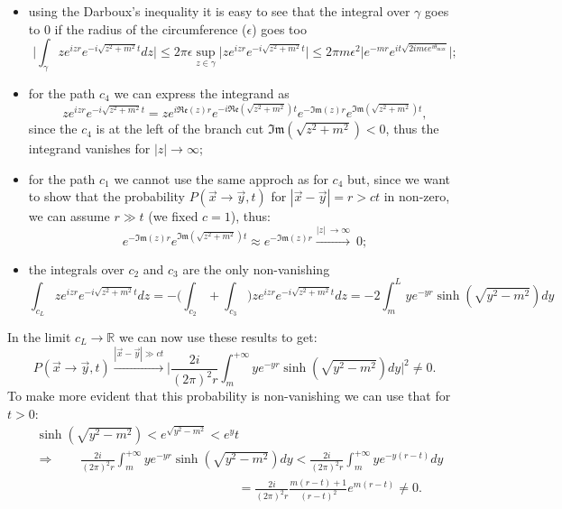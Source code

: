 \begin{itemize}
    \item using the Darboux's inequality it is easy to see that the integral over $\gamma$ goes to 0 if the radius of the circumference ($\epsilon$) goes too 
    \begin{equation*}
        \bigg|\int_{\gamma}ze^{izr}e^{-i\sqrt{z^2+m^2}t}dz\bigg|\leq2\pi \epsilon\sup_{z\in\gamma}\bigg|ze^{izr}e^{-i\sqrt{z^2+m^2}t}\bigg|\leq2\pi m \epsilon^2\bigg|e^{-mr}e^{it\sqrt{2im\epsilon e^{i\theta_{\text{max}}}}}\bigg|;
    \end{equation*}
    \item for the path $c_4$ we can express the integrand as
    \begin{equation*}
        ze^{izr}e^{-i\sqrt{z^2+m^2}t}=ze^{i\mathfrak{Re}(z)r}e^{-i\mathfrak{Re}(\sqrt{z^2+m^2})t}e^{-\mathfrak{Im}(z)r}e^{\mathfrak{Im}(\sqrt{z^2+m^2})t},
    \end{equation*}
    since the $c_4$ is at the left of the branch cut $\mathfrak{Im}(\sqrt{z^2+m^2})<0$, thus the integrand vanishes for $|z|\rightarrow\infty$;
    \item for the path $c_1$ we cannot use the same approch as for $c_4$ but, since we want to show that the probability $ P(\vec x \rightarrow\vec y,t)$ for $|\vec x-\vec y|=r>ct$ in non-zero, we can assume $r\gg t$ (we fixed $c=1$), thus:
    \begin{equation*}
        e^{-\mathfrak{Im}(z)r}e^{\mathfrak{Im}(\sqrt{z^2+m^2})t}\approx e^{-\mathfrak{Im}(z)r}\xrightarrow{|z|\ \rightarrow \infty}\ 0;
    \end{equation*}
    \item the integrals over $c_2$ and $c_3$ are the only non-vanishing 
    \begin{equation*}
        \int_{c_L}ze^{izr}e^{-i\sqrt{z^2+m^2}t}dz=-\biggl(\int_{c_2}+\int_{c_3}\biggr)ze^{izr}e^{-i\sqrt{z^2+m^2}t}dz=-2\int_{m}^{L} ye^{-yr}\sinh(\sqrt{y^2-m^2})dy
    \end{equation*} 
\end{itemize}
In the limit $c_L\rightarrow\mathbb{R}$ we can now use these results to get:
\begin{equation*}
    P(\vec x \rightarrow\vec y,t)\xrightarrow{|\vec x-\vec y|\gg ct}\bigg|\frac{2i}{(2\pi)^2r}\int_{m}^{+\infty} ye^{-yr}\sinh(\sqrt{y^2-m^2})dy\bigg|^2\neq 0.
\end{equation*}
To make more evident that this probability is non-vanishing we can use that for $t>0$:
\begin{align*}
    &\sinh(\sqrt{y^2-m^2})<e^{\sqrt{y^2-m^2}}<e^yt\\&\Rightarrow\qquad \frac{2i}{(2\pi)^2r}\int_{m}^{+\infty} ye^{-yr}\sinh(\sqrt{y^2-m^2})dy<\frac{2i}{(2\pi)^2r}\int_{m}^{+\infty} ye^{-y(r-t)}dy\\&\qquad\qquad\qquad\qquad\qquad\qquad\qquad\qquad=\frac{2i}{(2\pi)^2r}\frac{m(r-t)+1}{(r-t)^2}e^{m(r-t)}\neq0.
\end{align*}
